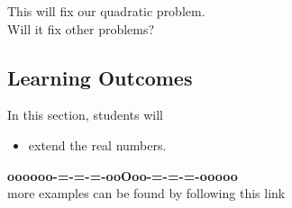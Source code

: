 \documentclass{ximera}
\begin{document}
This will fix our quadratic problem. \\


Will it fix other problems?






\subsection*{Learning Outcomes}



\begin{sectionOutcomes}
In this section, students will 

\begin{itemize}
\item extend the real numbers.
\end{itemize}
\end{sectionOutcomes}










\begin{center}
\textbf{\textcolor{green!50!black}{oooooo-=-=-=-ooOoo-=-=-=-ooooo}} \\

more examples can be found by following this link\\ 

\end{center}
\end{document}
